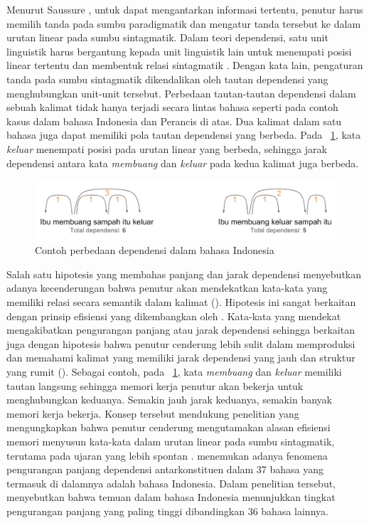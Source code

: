Menurut Saussure \citep{key2017course}, untuk dapat mengantarkan informasi tertentu, penutur harus memilih tanda pada sumbu paradigmatik dan mengatur tanda tersebut ke dalam urutan linear pada sumbu sintagmatik. Dalam teori dependensi, satu unit linguistik harus bergantung kepada unit linguistik lain untuk menempati posisi linear tertentu dan membentuk relasi sintagmatik \citep[p. 11-14]{tesniere1959elements}. Dengan kata lain, pengaturan tanda pada sumbu sintagmatik dikendalikan oleh tautan dependensi yang menghubungkan unit-unit tersebut. Perbedaan tautan-tautan dependensi dalam sebuah kalimat tidak hanya terjadi secara lintas bahasa seperti pada contoh kasus dalam bahasa Indonesia dan Perancis di atas. Dua kalimat dalam satu bahasa juga dapat memiliki pola tautan dependensi yang berbeda. Pada \pic~\ref{fig:contoh-dependensi}, kata \textit{keluar} menempati posisi pada urutan linear yang berbeda, sehingga jarak dependensi antara kata \textit{membuang} dan \textit{keluar} pada kedua kalimat juga berbeda. 
\begin{figure}
	\centering \includegraphics[width=1
	\textwidth] {pics/contoh-dependensi.png} \caption{Contoh perbedaan dependensi dalam bahasa Indonesia} 
\label{fig:contoh-dependensi} \end{figure}

Salah satu hipotesis yang membahas panjang dan jarak dependensi menyebutkan adanya kecenderungan bahwa penutur akan mendekatkan kata-kata yang memiliki relasi secara semantik dalam kalimat (\citealp{futrell2015large, liu2017dependency}). Hipotesis ini sangat berkaitan dengan prinsip efisiensi yang dikembangkan oleh \cite{hawkins2004efficiency}. Kata-kata yang mendekat mengakibatkan pengurangan panjang atau jarak dependensi sehingga berkaitan juga dengan hipotesis bahwa penutur cenderung lebih sulit dalam memproduksi dan memahami kalimat yang memiliki jarak dependensi yang jauh dan struktur yang rumit (\citealp{hawkins2004efficiency, dillon2011structured}). Sebagai contoh, pada \pic~\ref{fig:contoh-dependensi}, kata \textit{membuang} dan \textit{keluar} memiliki tautan langsung sehingga memori kerja penutur akan bekerja untuk menghubungkan keduanya. Semakin jauh jarak keduanya, semakin banyak memori kerja bekerja. Konsep tersebut mendukung penelitian \cite{jaeger2006redundancy} yang mengungkapkan bahwa penutur cenderung mengutamakan alasan efisiensi memori menyusun kata-kata dalam urutan linear pada sumbu sintagmatik, terutama pada ujaran yang lebih spontan \citep{jaeger2006redundancy}. \cite{futrell2015large} menemukan adanya fenomena pengurangan panjang dependensi antarkonstituen dalam 37 bahasa yang termasuk di dalamnya adalah bahasa Indonesia. Dalam penelitian tersebut, \cite{futrell2015large} menyebutkan bahwa temuan dalam bahasa Indonesia menunjukkan tingkat pengurangan panjang yang paling tinggi dibandingkan 36 bahasa lainnya. 

